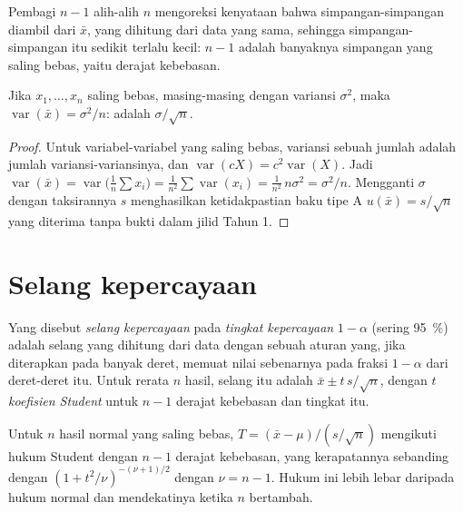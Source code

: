 Pembagi $n - 1$ alih-alih $n$ mengoreksi kenyataan bahwa simpangan-simpangan
diambil dari $\bar x$, yang dihitung dari data yang sama, sehingga
simpangan-simpangan itu sedikit terlalu kecil: $n - 1$ adalah banyaknya
simpangan yang saling bebas, yaitu derajat kebebasan.

\begin{theorem}\label{thm:b2:measurement-statistics:mean-variance}
Jika $x_1, \dots, x_n$ saling bebas, masing-masing dengan variansi $\sigma^2$, maka $\operatorname{var}(\bar x) =
\sigma^2/n$:  adalah $\sigma/\sqrt n$.
\end{theorem}

\begin{proof}
Untuk variabel-variabel yang saling bebas, variansi sebuah jumlah adalah
jumlah variansi-variansinya, dan
$\operatorname{var}(cX) = c^2\operatorname{var}(X)$. Jadi $\operatorname{var}(\bar x) =
\operatorname{var}\bigl(\tfrac1n\sum x_i\bigr) = \tfrac{1}{n^2}\sum\operatorname{var}(x_i) =
\tfrac{1}{n^2}\,n\sigma^2 = \sigma^2/n$. Mengganti $\sigma$ dengan taksirannya
$s$ menghasilkan ketidakpastian baku tipe A
$u(\bar x) = s/\sqrt n$ yang diterima tanpa bukti dalam jilid Tahun 1.
\end{proof}

\section{Selang kepercayaan}

\begin{definition}\label{def:b2:measurement-statistics:confidence}
Yang disebut \emph{selang kepercayaan} pada
\emph{tingkat kepercayaan}
$1 - \alpha$ (sering 95~\%) adalah selang yang dihitung dari data dengan
sebuah aturan yang, jika diterapkan pada banyak deret, memuat nilai
sebenarnya pada fraksi $1 - \alpha$ dari deret-deret itu. Untuk rerata $n$
hasil, selang itu adalah $\bar x \pm t\,s/\sqrt n$, dengan $t$
\emph{koefisien Student}
untuk $n - 1$ derajat kebebasan dan tingkat itu.
\end{definition}

\begin{proposition}\label{prop:b2:measurement-statistics:student}
Untuk $n$ hasil normal yang saling bebas, $T = (\bar x - \mu)/(s/\sqrt n)$
mengikuti hukum Student dengan
$n - 1$ derajat kebebasan, yang kerapatannya sebanding dengan $(1 + t^2/\nu)^{-(\nu+1)/2}$ dengan
$\nu = n - 1$. Hukum ini lebih lebar daripada hukum normal dan mendekatinya
ketika $n$ bertambah.
\end{proposition}

